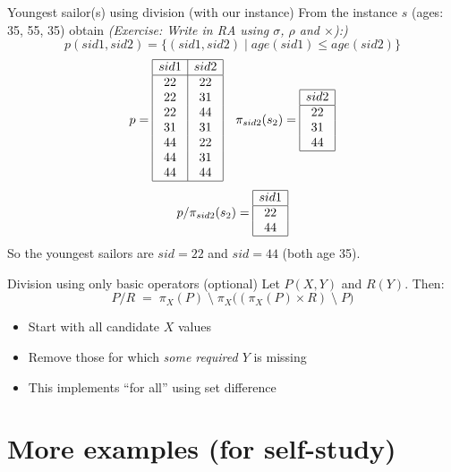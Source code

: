 \documentclass[10pt,aspectratio=169]{beamer}
\newcommand{\proj}{\pi}
\begin{document}
\begin{frame}{Youngest sailor(s) using division (with our instance)}
\small
From the instance \(s\) (ages: 35, 55, 35) obtain \textit{(Exercise: Write in RA using $\sigma$, $\rho$ and $\times$):)}
\[
p(sid1,sid2)=\{(sid1,sid2)\mid age(sid1)\le age(sid2)\}
\] 
\[
p=\begin{array}{|c|c|}\hline
sid1&sid2\\\hline
22&22\\
22&31\\
22&44\\
31&31\\
44&22\\
44&31\\
44&44\\\hline
\end{array}
\quad
\proj_{sid2}(s_2)=\begin{array}{|c|}\hline sid2\\\hline 22\\31\\44\\\hline\end{array}
\]
\[
p/\proj_{sid2}(s_2)=
\begin{array}{|c|}\hline sid1\\\hline 22\\44\\\hline\end{array}
\]
\small So the youngest sailors are \(sid=22\) and \(sid=44\) (both age 35).
\end{frame}

\begin{frame}{Division using only basic operators (optional)}
Let \(P(X,Y)\) and \(R(Y)\). Then:
\[
P / R \;=\; \proj_X(P)\; \setminus\; \proj_X\big( (\proj_X(P)\times R)\; \setminus\; P \big)
\]
\begin{itemize}
  \item Start with all candidate \(X\) values
  \item Remove those for which \emph{some required \(Y\)} is missing
  \item This implements “for all” using set difference
\end{itemize}
\end{frame}

\section{More examples (for self-study)}
\end{document}
